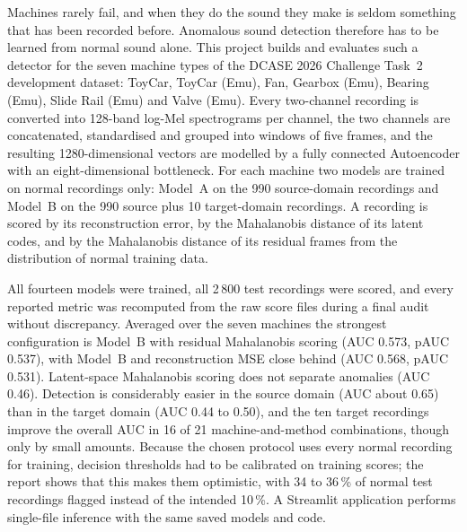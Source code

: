 Machines rarely fail, and when they do the sound they make is seldom something that has been recorded before. Anomalous sound detection therefore has to be learned from normal sound alone. This project builds and evaluates such a detector for the seven machine types of the DCASE 2026 Challenge Task~2 development dataset: ToyCar, ToyCar (Emu), Fan, Gearbox (Emu), Bearing (Emu), Slide Rail (Emu) and Valve (Emu). Every two-channel recording is converted into 128-band log-Mel spectrograms per channel, the two channels are concatenated, standardised and grouped into windows of five frames, and the resulting 1280-dimensional vectors are modelled by a fully connected Autoencoder with an eight-dimensional bottleneck. For each machine two models are trained on normal recordings only: Model~A on the 990 source-domain recordings and Model~B on the 990 source plus 10 target-domain recordings. A recording is scored by its reconstruction error, by the Mahalanobis distance of its latent codes, and by the Mahalanobis distance of its residual frames from the distribution of normal training data.

All fourteen models were trained, all 2\,800 test recordings were scored, and every reported metric was recomputed from the raw score files during a final audit without discrepancy. Averaged over the seven machines the strongest configuration is Model~B with residual Mahalanobis scoring (AUC 0.573, pAUC 0.537), with Model~B and reconstruction MSE close behind (AUC 0.568, pAUC 0.531). Latent-space Mahalanobis scoring does not separate anomalies (AUC 0.46). Detection is considerably easier in the source domain (AUC about 0.65) than in the target domain (AUC 0.44 to 0.50), and the ten target recordings improve the overall AUC in 16 of 21 machine-and-method combinations, though only by small amounts. Because the chosen protocol uses every normal recording for training, decision thresholds had to be calibrated on training scores; the report shows that this makes them optimistic, with 34 to 36\,\% of normal test recordings flagged instead of the intended 10\,\%. A Streamlit application performs single-file inference with the same saved models and code.
